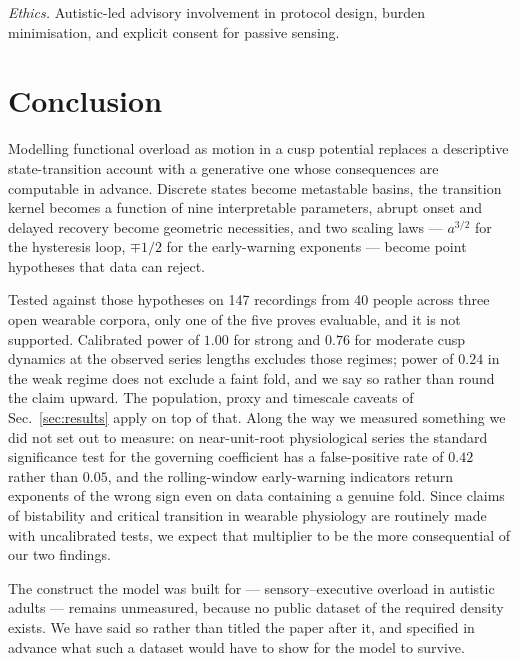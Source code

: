 \documentclass[conference]{IEEEtran}
\begin{document}
\emph{Ethics.} Autistic-led advisory involvement in protocol design, burden
minimisation, and explicit consent for passive sensing.

\section{Conclusion}

Modelling functional overload as motion in a cusp potential replaces a
descriptive state-transition account with a generative one whose consequences
are computable in advance. Discrete states become metastable basins, the
transition kernel becomes a function of nine interpretable parameters, abrupt
onset and delayed recovery become geometric necessities, and two scaling laws
--- $a^{3/2}$ for the hysteresis loop, $\mp1/2$ for the early-warning
exponents --- become point hypotheses that data can reject.

Tested against those hypotheses on 147 recordings from 40 people across three
open wearable corpora, only one of the five proves evaluable, and it is not
supported. Calibrated power of $1.00$ for strong and $0.76$ for moderate cusp
dynamics at the observed series lengths excludes those regimes; power of $0.24$
in the weak regime does not exclude a faint fold, and we say so rather than
round the claim upward. The population, proxy and timescale caveats of
Sec.~\ref{sec:results} apply on top of that. Along the way we measured something we did not set out to measure: on
near-unit-root physiological series the standard significance test for the
governing coefficient has a false-positive rate of $0.42$ rather than $0.05$,
and the rolling-window early-warning indicators return exponents of the wrong
sign even on data containing a genuine fold. Since claims of bistability and critical transition in wearable
physiology are routinely made with uncalibrated tests, we expect that
multiplier to be the more consequential of our two findings.

The construct the model was built for --- sensory--executive overload in
autistic adults --- remains unmeasured, because no public dataset of the
required density exists. We have said so rather than titled the paper after it,
and specified in advance what such a dataset would have to show for the model
to survive.

\end{document}
